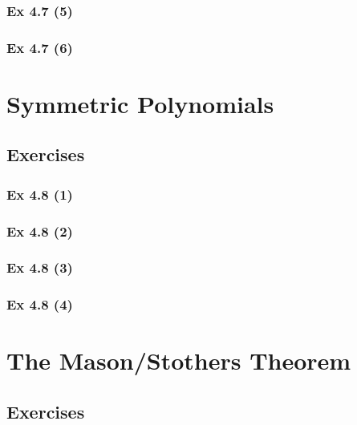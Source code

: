 \subsubsection{Ex 4.7 (5)}\label{sec:Ex_4.7.5}

\subsubsection{Ex 4.7 (6)}\label{sec:Ex_4.7.6}

\newpage		%

\section{Symmetric Polynomials}\label{sec:4.8}
\subsection{Exercises}\label{sec:4.8_Exercises}

\subsubsection{Ex 4.8 (1)}\label{sec:Ex_4.8.1}

\subsubsection{Ex 4.8 (2)}\label{sec:Ex_4.8.2}

\subsubsection{Ex 4.8 (3)}\label{sec:Ex_4.8.3}

\subsubsection{Ex 4.8 (4)}\label{sec:Ex_4.8.4}

\newpage		%

\section{The Mason/Stothers Theorem}\label{sec:4.9}
\subsection{Exercises}\label{sec:4.9_Exercises}

